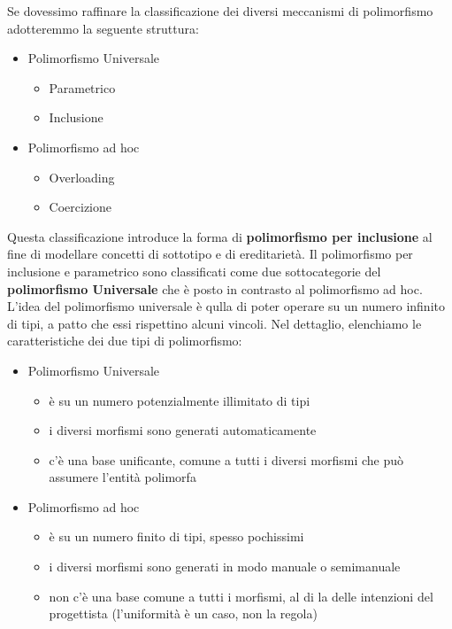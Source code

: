 \documentclass{article}
\begin{document}
	Se dovessimo raffinare la classificazione dei diversi meccanismi di polimorfismo adotteremmo la seguente struttura:
	\begin{itemize}
		\item Polimorfismo Universale
		\begin{itemize}
			\item Parametrico
			\item Inclusione
		\end{itemize}
		\item Polimorfismo ad hoc
		\begin{itemize}
			\item Overloading
			\item Coercizione
		\end{itemize}
	\end{itemize}
	Questa classificazione introduce la forma di \textbf{polimorfismo per inclusione} al fine di modellare concetti di sottotipo e di ereditarietà. Il polimorfismo per inclusione e parametrico sono classificati come due sottocategorie del \textbf{polimorfismo Universale} che è posto in contrasto al polimorfismo ad hoc. L'idea del polimorfismo universale è qulla di poter operare su un numero infinito di tipi, a patto che essi rispettino alcuni vincoli. Nel dettaglio, elenchiamo le caratteristiche dei due tipi di polimorfismo:
	\begin{itemize}
		\item Polimorfismo Universale
		\begin{itemize}
			\item è su un numero potenzialmente illimitato di tipi
			\item i diversi morfismi sono generati automaticamente
			\item c'è una base unificante, comune a tutti i diversi morfismi che può assumere l'entità polimorfa
		\end{itemize}
		\item Polimorfismo ad hoc
		\begin{itemize}
			\item è su un numero finito di tipi, spesso pochissimi
			\item i diversi morfismi sono generati in modo manuale o semimanuale
			\item non c'è una base comune a tutti i morfismi, al di la delle intenzioni del progettista (l'uniformità è un caso, non la regola)
		\end{itemize}
	\end{itemize}
\end{document}
